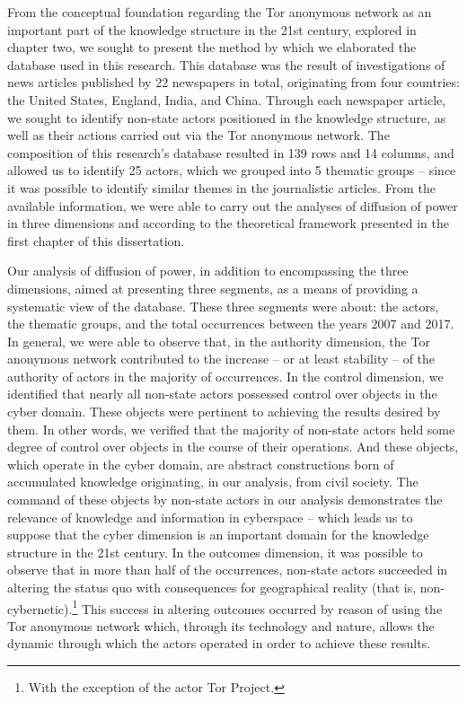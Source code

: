 From the conceptual foundation regarding the Tor anonymous network as an important part of the knowledge structure in the 21st century, explored in chapter two, we sought to present the method by which we elaborated the database used in this research. This database was the result of investigations of news articles published by 22 newspapers in total, originating from four countries: the United States, England, India, and China. Through each newspaper article, we sought to identify non-state actors positioned in the knowledge structure, as well as their actions carried out via the Tor anonymous network. The composition of this research's database resulted in 139 rows and 14 columns, and allowed us to identify 25 actors, which we grouped into 5 thematic groups -- since it was possible to identify similar themes in the journalistic articles. From the available information, we were able to carry out the analyses of diffusion of power in three dimensions and according to the theoretical framework presented in the first chapter of this dissertation.

Our analysis of diffusion of power, in addition to encompassing the three dimensions, aimed at presenting three segments, as a means of providing a systematic view of the database. These three segments were about: the actors, the thematic groups, and the total occurrences between the years 2007 and 2017. In general, we were able to observe that, in the authority dimension, the Tor anonymous network contributed to the increase -- or at least stability -- of the authority of actors in the majority of occurrences. In the control dimension, we identified that nearly all non-state actors possessed control over objects in the cyber domain. These objects were pertinent to achieving the results desired by them. In other words, we verified that the majority of non-state actors held some degree of control over objects in the course of their operations. And these objects, which operate in the cyber domain, are abstract constructions born of accumulated knowledge originating, in our analysis, from civil society. The command of these objects by non-state actors in our analysis demonstrates the relevance of knowledge and information in cyberspace -- which leads us to suppose that the cyber dimension is an important domain for the knowledge structure in the 21st century. In the outcomes dimension, it was possible to observe that in more than half of the occurrences, non-state actors succeeded in altering the status quo with consequences for geographical reality (that is, non-cybernetic).\footnote{With the exception of the actor Tor Project.} This success in altering outcomes occurred by reason of using the Tor anonymous network which, through its technology and nature, allows the dynamic through which the actors operated in order to achieve these results.

